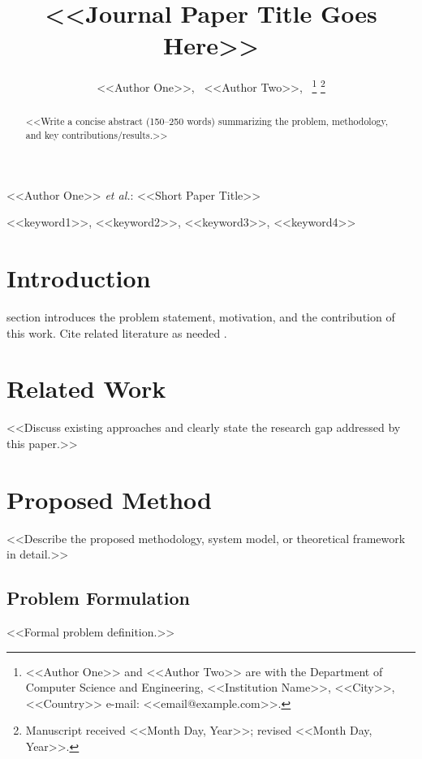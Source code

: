 \documentclass[journal]{IEEEtran}
\begin{document}
\title{<<Journal Paper Title Goes Here>>}

\author{<<Author One>>,~
        <<Author Two>>,~
\thanks{<<Author One>> and <<Author Two>> are with the Department of Computer Science and Engineering, <<Institution Name>>, <<City>>, <<Country>> e-mail: <<email@example.com>>.}
\thanks{Manuscript received <<Month Day, Year>>; revised <<Month Day, Year>>.}}

%
{<<Author One>> \MakeLowercase{\textit{et al.}}: <<Short Paper Title>>}

\maketitle

\begin{abstract}
<<Write a concise abstract (150--250 words) summarizing the problem, methodology, and key contributions/results.>>
\end{abstract}

\begin{IEEEkeywords}
<<keyword1>>, <<keyword2>>, <<keyword3>>, <<keyword4>>
\end{IEEEkeywords}

\IEEEpeerreviewmaketitle

\section{Introduction}
 section introduces the problem statement, motivation, and the contribution of this work. Cite related literature as needed \cite{ref1, ref2}.

\section{Related Work}
<<Discuss existing approaches and clearly state the research gap addressed by this paper.>>

\section{Proposed Method}
<<Describe the proposed methodology, system model, or theoretical framework in detail.>>

\subsection{Problem Formulation}
<<Formal problem definition.>>
\end{document}
